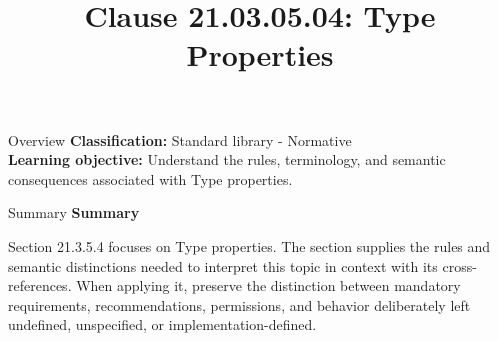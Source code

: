 \documentclass[10pt,letterpaper]{article}
\title{Clause 21.03.05.04: Type Properties}
\author{}
\date{}
\begin{document}
\maketitle
\begin{CornellOverviewBox}{Overview}
\textbf{Classification:} Standard library - Normative\\[2pt]
\textbf{Learning objective:} Understand the rules, terminology, and semantic consequences associated with Type properties.
\end{CornellOverviewBox}\begin{CornellSummaryBox}{Summary}
{\sffamily\bfseries\color{Accent} Summary}\par\vspace{3pt}Section 21.3.5.4 focuses on Type properties. The section supplies the rules and semantic distinctions needed to interpret this topic in context with its cross-references. When applying it, preserve the distinction between mandatory requirements, recommendations, permissions, and behavior deliberately left undefined, unspecified, or implementation-defined.
\end{CornellSummaryBox}
\end{document}
